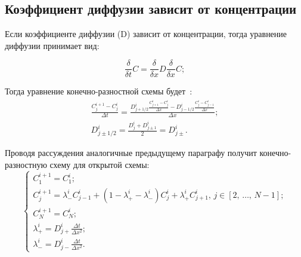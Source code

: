 \subsection{Коэффициент диффузии зависит от концентрации}

Если коэффициенте диффузии (D) зависит от концентрации, тогда уравнение диффузии принимает вид:

\begin{equation}\label{eq:diffD(x)t}
	\frac{\delta}{\delta t} C = \frac{\delta}{\delta x}D\frac{\delta}{\delta x} C;
\end{equation}

Тогда уравнение конечно-разностной схемы будет~\cite{FDDiff}:
\begin{gather}\label{eq:diffD(x)tFD}
	\frac{C_{j}^{i+1} - C_{j}^{i}}{\Delta t} = \frac{ D_{j+1/2}^{i}\frac{C^{i}_{j+1} - C^{i}_{j}}{\Delta x} - D_{j-1/2}^{i}\frac{C^{i}_{j} - C^{i}_{j-1}}{\Delta x} }{\Delta x};\\
	D_{j\pm1/2}^{i} = \frac{D^{i}_{j} + D^{i}_{j\pm1}}{2} = D_{j\pm}^{i}.
\end{gather}

Проводя рассуждения аналогичные предыдущему параграфу получит конечно-разностную схему для открытой схемы:
\begin{equation}
	\begin{cases}
		C^{i+1}_{1} = C^{i}_{1};\\
		C^{i+1}_{j} = \lambda_{-}^{i} C^{i}_{j-1} + (1 - \lambda^{i}_{+} - \lambda^{i}_{-})C^{i}_{j} + \lambda^{i}_{+} C^{i}_{j+1},\,j \in [2,\,\dots,\,N-1];\\
		C^{i+1}_{N} = C^{i}_{N};\\
		\lambda^{i}_{+} = D_{j+}^{i}\frac{\Delta t}{\Delta x^{2}};\\
		\lambda^{i}_{-} = D_{j-}^{i}\frac{\Delta t}{\Delta x^{2}}.
	\end{cases}
\end{equation}
